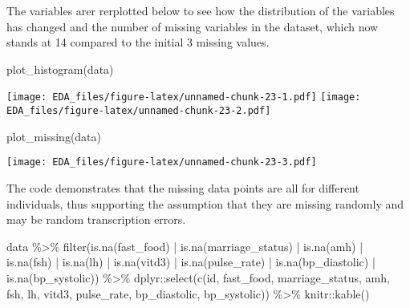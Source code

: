 \documentclass[
]{article}
\newenvironment{Shaded}{\begin{snugshade}}{\end{snugshade}}
\newcommand{\FunctionTok}[1]{\textcolor[rgb]{0.00,0.00,0.00}{#1}}
\newcommand{\NormalTok}[1]{#1}
\newcommand{\SpecialCharTok}[1]{\textcolor[rgb]{0.00,0.00,0.00}{#1}}
\begin{document}
The variables arer rerplotted below to see how the distribution of the
variables has changed and the number of missing variables in the
dataset, which now stands at 14 compared to the initial 3 missing
values.

\begin{Shaded}
\begin{Highlighting}[]
\FunctionTok{plot\_histogram}\NormalTok{(data)}
\end{Highlighting}
\end{Shaded}

\texttt{[image: EDA\_files/figure-latex/unnamed-chunk-23-1.pdf]}
\texttt{[image: EDA\_files/figure-latex/unnamed-chunk-23-2.pdf]}

\begin{Shaded}
\begin{Highlighting}[]
\FunctionTok{plot\_missing}\NormalTok{(data)}
\end{Highlighting}
\end{Shaded}

\texttt{[image: EDA\_files/figure-latex/unnamed-chunk-23-3.pdf]}

The code demonstrates that the missing data points are all for different
individuals, thus supporting the assumption that they are missing
randomly and may be random transcription errors.

\begin{Shaded}
\begin{Highlighting}[]
\NormalTok{data }\SpecialCharTok{\%\textgreater{}\%} 
  \FunctionTok{filter}\NormalTok{(}\FunctionTok{is.na}\NormalTok{(fast\_food) }\SpecialCharTok{|} 
           \FunctionTok{is.na}\NormalTok{(marriage\_status) }\SpecialCharTok{|}
           \FunctionTok{is.na}\NormalTok{(amh) }\SpecialCharTok{|}
           \FunctionTok{is.na}\NormalTok{(fsh) }\SpecialCharTok{|}
           \FunctionTok{is.na}\NormalTok{(lh) }\SpecialCharTok{|}
           \FunctionTok{is.na}\NormalTok{(vitd3) }\SpecialCharTok{|}
           \FunctionTok{is.na}\NormalTok{(pulse\_rate) }\SpecialCharTok{|}
           \FunctionTok{is.na}\NormalTok{(bp\_diastolic) }\SpecialCharTok{|}
           \FunctionTok{is.na}\NormalTok{(bp\_systolic)) }\SpecialCharTok{\%\textgreater{}\%} 
\NormalTok{  dplyr}\SpecialCharTok{::}\FunctionTok{select}\NormalTok{(}\FunctionTok{c}\NormalTok{(id, fast\_food, marriage\_status, amh, fsh, lh, vitd3, pulse\_rate, bp\_diastolic, bp\_systolic)) }\SpecialCharTok{\%\textgreater{}\%} 
\NormalTok{  knitr}\SpecialCharTok{::}\FunctionTok{kable}\NormalTok{()}
\end{Highlighting}
\end{Shaded}
\end{document}
